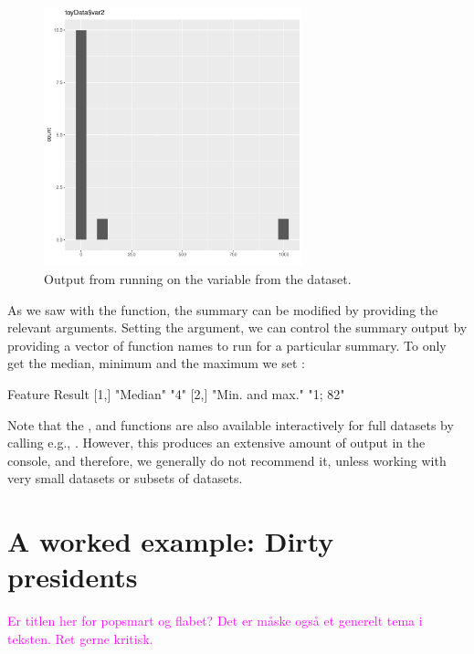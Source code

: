 \documentclass[article,shortnames]{jss}
\newcommand{\hl}[1]{\textcolor{magenta}{#1}}
\begin{document}
\begin{figure}[tb]
\begin{center}
\includegraphics[width=7.5cm]{toyData-var2.pdf}
\end{center}
\caption{Output from running  on the variable  from the
 dataset.}
\label{fig:example2}
\end{figure}


As we saw with the  function, the summary can be modified
by providing the relevant  arguments. Setting the
 argument, we can control the summary output by
providing a vector of function names to run for a particular summary. To
only get the median, minimum and the maximum we set
:

\begin{Schunk}
\begin{Soutput}
     Feature         Result 
[1,] "Median"        "4"    
[2,] "Min. and max." "1; 82"
\end{Soutput}
\end{Schunk}

Note that the ,  and  functions are also available interactively for full datasets by calling e.g., . However, this produces an extensive amount of output in the console, and therefore, we generally do not recommend it, unless working with very small datasets or subsets of datasets.

\section{A worked example: Dirty presidents} 
\label{sec:bigExample}
\hl{Er titlen her for popsmart og flabet? Det er måske også et generelt tema i teksten. Ret gerne kritisk.}
\end{document}
